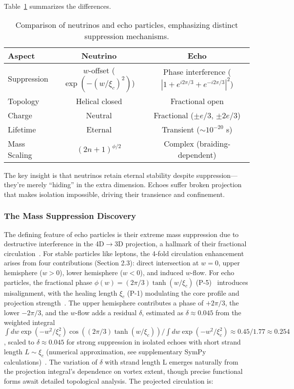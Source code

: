 Table~\ref{tab:echo-neutrino-revised} summarizes the differences.

\begin{table}[h!]
\centering
\begin{tabular}{|l|c|c|}
\hline
Aspect & Neutrino & Echo \\
\hline
Suppression & $w$-offset ($\exp(-(w/\xi_c)^2)$) & Phase interference ($|1 + e^{i 2\pi/3} + e^{-i 2\pi/3}|^2$) \\
Topology & Helical closed & Fractional open \\
Charge & Neutral & Fractional ($\pm e/3$, $\pm 2e/3$) \\
Lifetime & Eternal & Transient ($\sim 10^{-20}$ s) \\
Mass Scaling & $(2n+1)^{\phi/2}$ & Complex (braiding-dependent) \\
\hline
\end{tabular}
\caption{Comparison of neutrinos and echo particles, emphasizing distinct suppression mechanisms.}
\label{tab:echo-neutrino-revised}
\end{table}

The key insight is that neutrinos retain eternal stability despite suppression---they're merely ``hiding'' in the extra dimension. Echoes suffer broken projection that makes isolation impossible, driving their transience and confinement.

\subsubsection{The Mass Suppression Discovery}

The defining feature of echo particles is their extreme mass suppression due to destructive interference in the 4D\(\to\)3D projection, a hallmark of their fractional circulation~\cite{Babaev2002}. For stable particles like leptons, the 4-fold circulation enhancement arises from four contributions (Section 2.3): direct intersection at \(w=0\), upper hemisphere (\(w > 0\)), lower hemisphere (\(w < 0\)), and induced \(w\)-flow. For echo particles, the fractional phase \(\phi(w) = (2\pi/3) \tanh(w/\xi_c)\) (P-5)~\cite{WikiFractional} introduces misalignment, with the healing length \(\xi_c\) (P-1) modulating the core profile and projection strength~\cite{Wimmer2020}. The upper hemisphere contributes a phase of \(+2\pi/3\), the lower \(-2\pi/3\), and the \(w\)-flow adds a residual \(\delta\), estimated as \(\delta \approx 0.045\) from the weighted integral \(\int dw \exp(-w^2/\xi_c^2) \cos\left( (2\pi/3) \tanh(w/\xi_c) \right) / \int dw \exp(-w^2/\xi_c^2) \approx 0.45/1.77 \approx 0.254\), scaled to \(\delta \approx 0.045\) for strong suppression in isolated echoes with short strand length \(L \sim \xi_c\) (numerical approximation, see supplementary SymPy calculations)~\cite{Yang2022}. The variation of $\delta$ with strand length L emerges naturally from the projection integral's dependence on vortex extent, though precise functional forms await detailed topological analysis. The projected circulation is:

